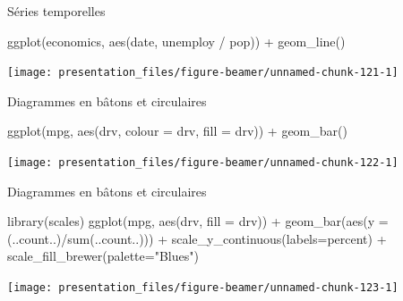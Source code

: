 \documentclass[12pt,handout,ignorenonframetext,]{beamer}
\newenvironment{Shaded}{}{}
\newcommand{\KeywordTok}[1]{\textcolor[rgb]{0.00,0.00,1.00}{{#1}}}
\newcommand{\DataTypeTok}[1]{{#1}}
\newcommand{\StringTok}[1]{\textcolor[rgb]{0.00,0.50,0.50}{{#1}}}
\newcommand{\NormalTok}[1]{{#1}}
\renewenvironment{Shaded}{\begin{snugshade}}{\end{snugshade}}
\begin{document}
\begin{frame}[fragile]{Séries temporelles}

\footnotesize \center

\begin{Shaded}
\begin{Highlighting}[]
\KeywordTok{ggplot}\NormalTok{(economics, }\KeywordTok{aes}\NormalTok{(date, unemploy /}\StringTok{ }\NormalTok{pop)) +}
\StringTok{  }\KeywordTok{geom_line}\NormalTok{()}
\end{Highlighting}
\end{Shaded}

\texttt{[image: presentation\_files/figure-beamer/unnamed-chunk-121-1]}

\end{frame}

\begin{frame}[fragile]{Diagrammes en bâtons et circulaires}

\footnotesize \center

\begin{Shaded}
\begin{Highlighting}[]
\KeywordTok{ggplot}\NormalTok{(mpg, }\KeywordTok{aes}\NormalTok{(drv, }\DataTypeTok{colour =} \NormalTok{drv, }\DataTypeTok{fill =} \NormalTok{drv)) +}\StringTok{ }
\StringTok{  }\KeywordTok{geom_bar}\NormalTok{()}
\end{Highlighting}
\end{Shaded}

\texttt{[image: presentation\_files/figure-beamer/unnamed-chunk-122-1]}

\end{frame}

\begin{frame}[fragile]{Diagrammes en bâtons et circulaires}

\footnotesize \center

\begin{Shaded}
\begin{Highlighting}[]
\KeywordTok{library}\NormalTok{(scales)}
\KeywordTok{ggplot}\NormalTok{(mpg, }\KeywordTok{aes}\NormalTok{(drv, }\DataTypeTok{fill =} \NormalTok{drv)) +}\StringTok{ }
\StringTok{  }\KeywordTok{geom_bar}\NormalTok{(}\KeywordTok{aes}\NormalTok{(}\DataTypeTok{y =} \NormalTok{(..count..)/}\KeywordTok{sum}\NormalTok{(..count..))) +}
\StringTok{  }\KeywordTok{scale_y_continuous}\NormalTok{(}\DataTypeTok{labels=}\NormalTok{percent) +}
\StringTok{  }\KeywordTok{scale_fill_brewer}\NormalTok{(}\DataTypeTok{palette=}\StringTok{"Blues"}\NormalTok{)}
\end{Highlighting}
\end{Shaded}

\texttt{[image: presentation\_files/figure-beamer/unnamed-chunk-123-1]}

\end{frame}
\end{document}

